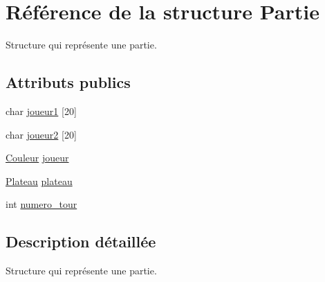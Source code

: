 \hypertarget{structPartie}{\section{\-Référence de la structure \-Partie}
\label{structPartie}
}


\-Structure qui représente une partie.  


\subsection*{\-Attributs publics}
\begin{DoxyCompactItemize}
\item 
char \hyperlink{structPartie_a42905bbdce5ccfd367a1b4195a433e01}{joueur1} \mbox{[}20\mbox{]}
\item 
char \hyperlink{structPartie_a90dd0f2162050b2f3169dcb860d975cf}{joueur2} \mbox{[}20\mbox{]}
\item 
\hyperlink{couleur_8h_aa304d0ca681f782b1d7735da33037dd7}{\-Couleur} \hyperlink{structPartie_a8b5c0c007da53d6d723f4300a1d9d4ad}{joueur}
\item 
\hyperlink{plateau_8h_a1d931a164827223830c123a512b04c5b}{\-Plateau} \hyperlink{structPartie_ae8a9b67f286f8bfd3e3a574f0ac2ac67}{plateau}
\item 
int \hyperlink{structPartie_a8b9894676f682941f84fc1ad6cac1155}{numero\-\_\-tour}
\end{DoxyCompactItemize}


\subsection{\-Description détaillée}
\-Structure qui représente une partie. 

